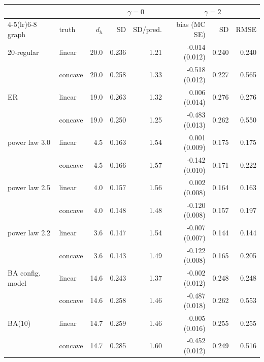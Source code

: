 \begin{tabular}{llrrrrrr}
\toprule
 & & & \multicolumn{2}{c}{$\gamma=0$} & \multicolumn{3}{c}{$\gamma=2$} \\
\cmidrule(lr){4-5}\cmidrule(lr){6-8}
graph & truth & $d_h$ & SD & SD/pred. & bias (MC SE) & SD & RMSE \\
\midrule
20-regular & linear & 20.0 & 0.236 & 1.21 & -0.014 (0.012) & 0.240 & 0.240 \\
 & concave & 20.0 & 0.258 & 1.33 & -0.518 (0.012) & 0.227 & 0.565 \\
\addlinespace
ER & linear & 19.0 & 0.263 & 1.32 & 0.006 (0.014) & 0.276 & 0.276 \\
 & concave & 19.0 & 0.250 & 1.25 & -0.483 (0.013) & 0.262 & 0.550 \\
\addlinespace
power law 3.0 & linear & 4.5 & 0.163 & 1.54 & 0.001 (0.009) & 0.175 & 0.175 \\
 & concave & 4.5 & 0.166 & 1.57 & -0.142 (0.010) & 0.171 & 0.222 \\
\addlinespace
power law 2.5 & linear & 4.0 & 0.157 & 1.56 & 0.002 (0.008) & 0.164 & 0.163 \\
 & concave & 4.0 & 0.148 & 1.48 & -0.120 (0.008) & 0.157 & 0.197 \\
\addlinespace
power law 2.2 & linear & 3.6 & 0.147 & 1.54 & -0.007 (0.007) & 0.144 & 0.144 \\
 & concave & 3.6 & 0.143 & 1.49 & -0.122 (0.008) & 0.165 & 0.205 \\
\addlinespace
BA config. model & linear & 14.6 & 0.243 & 1.37 & -0.002 (0.012) & 0.248 & 0.248 \\
 & concave & 14.6 & 0.258 & 1.46 & -0.487 (0.018) & 0.262 & 0.553 \\
\addlinespace
BA(10) & linear & 14.7 & 0.259 & 1.46 & -0.005 (0.016) & 0.255 & 0.255 \\
 & concave & 14.7 & 0.285 & 1.60 & -0.452 (0.012) & 0.249 & 0.516 \\
\bottomrule
\end{tabular}
